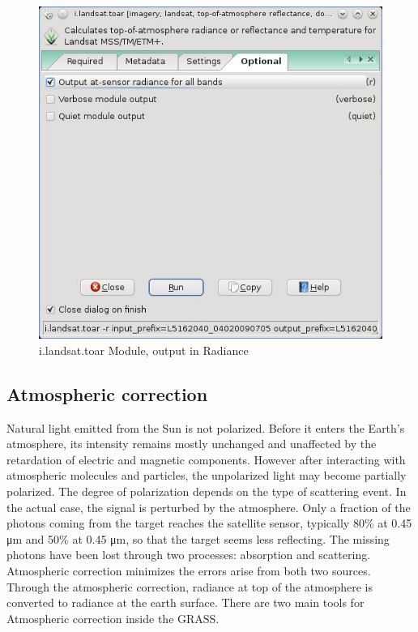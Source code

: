 \begin{figure}[htbp]
   \centering
   \includegraphics[scale=0.4]{gipe014.png}
   \caption{i.landsat.toar Module, output in Radiance}
   \label{fig:gipe014}
\end{figure}

\subsection{Atmospheric correction} 
Natural light emitted from the Sun is not polarized. Before it enters the Earth's atmosphere, its intensity remains mostly unchanged and unaffected by the retardation of electric and magnetic components. However after interacting with atmospheric molecules and particles, the unpolarized light may become partially polarized. The degree of polarization depends on the type of scattering event. In the actual case, the signal is perturbed by the atmosphere. Only a fraction of the photons coming from the target reaches the satellite sensor, typically 80\%  at 0.45 μm and 50\% at 0.45  μm, so that the target seems less reflecting. The missing photons have been lost through two processes: absorption and scattering. Atmospheric correction minimizes the errors arise from both two sources.\newline
Through the atmospheric correction, radiance at top of the atmosphere is converted to radiance at the earth surface.\newline
There are two main tools for Atmospheric correction inside the GRASS.\newline


